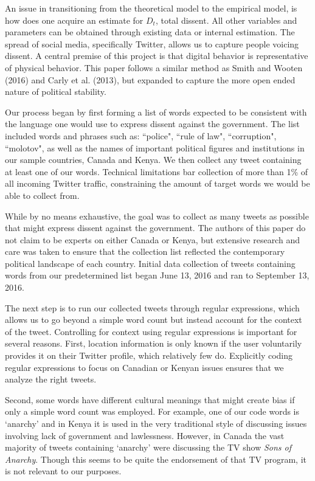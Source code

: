 \documentclass[12pt]{article}
\begin{document}
\begin{spacing}{1.5}
An issue in transitioning from the theoretical model to the empirical model, is how does one acquire an estimate for $D_t$, total dissent. All other variables and parameters can be obtained through existing data or internal estimation. The spread of social media, specifically Twitter, allows us to capture people voicing dissent. A central premise of this project is that digital behavior is representative of physical behavior. This paper follows a similar method as Smith and Wooten (2016) and Carly et al. (2013), but expanded to capture the more open ended nature of political stability. 


Our process began by first forming a list of words expected to be consistent with the language one would use to express dissent against the government. The list included words and phrases such as: ``police", ``rule of law", ``corruption", ``molotov", as well as the names of important political figures and institutions in our sample countries, Canada and Kenya. We then collect any tweet containing at least one of our words. Technical limitations bar collection of more than 1\% of all incoming Twitter traffic, constraining the amount of target words we would be able to collect from. 

While by no means exhaustive, the goal was to collect as many tweets as possible that might express dissent against the government. The authors of this paper do not claim to be experts on either Canada or Kenya, but extensive research and care was taken to ensure that the collection list reflected the contemporary political landscape of each country. Initial data collection of tweets containing words from our predetermined list began June 13, 2016 and ran to September 13, 2016. 


The next step is to run our collected tweets through regular expressions, which allows us to go beyond a simple word count but instead account for the context of the tweet. Controlling for context using regular expressions is important for several reasons. First, location information is only known if the user voluntarily provides it on their Twitter profile, which relatively few do. Explicitly coding regular expressions to focus on Canadian or Kenyan issues ensures that we analyze the right tweets.   

Second, some words have different cultural meanings that might create bias if only a simple word count was employed. For example, one of our code words is `anarchy' and in Kenya it is used in the very traditional style of discussing issues involving lack of government and lawlessness. However, in Canada the vast majority of tweets containing `anarchy' were discussing the TV show \textit{Sons of Anarchy}. Though this seems to be quite the endorsement of that TV program, it is not relevant to our purposes. 


\end{spacing}
\end{document}

